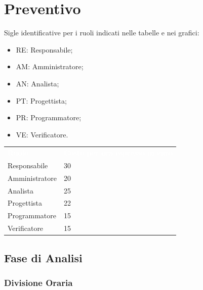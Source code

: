 \section{Preventivo}
Sigle identificative per i ruoli indicati nelle tabelle e nei grafici:
\begin{itemize}
    \item RE: Responsabile;
    \item AM: Amministratore;
    \item AN: Analista;
    \item PT: Progettista;
    \item PR: Programmatore;
    \item VE: Verificatore.
\end{itemize}
{
	
\renewcommand{\arraystretch}{2}
\begin{table}[h!]
\centering
\caption{Tabella con i costi per ogni ruolo}
\begin{longtable}{ C{3cm} C{3cm}}
	\textcolor{white}{\textbf{Ruolo}} & 
	\textcolor{white}{\textbf{Costo per ora espresso in euro}}\\	
			
			Responsabile & 30\\
			Amministratore & 20\\
			Analista & 25\\
			Progettista & 22\\
			Programmatore & 15\\
			Verificatore & 15\\
			
		\end{longtable}
		
	\end{table}

}

\clearpage
\subsection{Fase di Analisi}
\subsubsection{Divisione Oraria}

